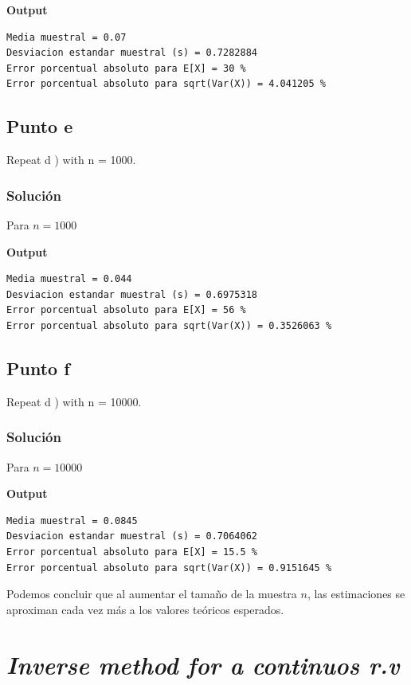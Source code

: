 \documentclass[12pt]{article}
\begin{document}
\textbf{Output}

\begin{lstlisting}
Media muestral = 0.07
Desviacion estandar muestral (s) = 0.7282884
Error porcentual absoluto para E[X] = 30 %
Error porcentual absoluto para sqrt(Var(X)) = 4.041205 %
\end{lstlisting}



\subsection{Punto e}
Repeat d ) with n = 1000.

\subsubsection{Solución}

Para $n=1000$


\textbf{Output}


\begin{lstlisting}
Media muestral = 0.044
Desviacion estandar muestral (s) = 0.6975318
Error porcentual absoluto para E[X] = 56 %
Error porcentual absoluto para sqrt(Var(X)) = 0.3526063 %
\end{lstlisting}




\subsection{Punto f}
Repeat d ) with n = 10000.

\subsubsection{Solución}

Para $n=10000$


\textbf{Output}


\begin{lstlisting}
Media muestral = 0.0845
Desviacion estandar muestral (s) = 0.7064062
Error porcentual absoluto para E[X] = 15.5 %
Error porcentual absoluto para sqrt(Var(X)) = 0.9151645 %
\end{lstlisting}

Podemos concluir que al aumentar el tamaño de la muestra $n$, las estimaciones se aproximan cada vez más a los valores teóricos esperados.




\section{\textit{Inverse method for a continuos r.v}}
\end{document}
